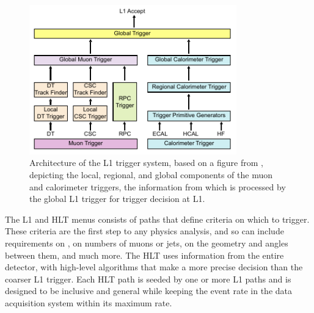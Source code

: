 \begin{figure}[tb]
  \centering
  \includegraphics[width=0.8\textwidth]{figures/cms/L1Architecture.pdf}
  \caption{Architecture of the L1 trigger system, based on a figure from \cite{Chatrchyan:2008zzk}, depicting the local, regional, and global components of the muon and calorimeter triggers, the information from which is processed by the global L1 trigger for trigger decision at L1.}
  \label{cms:L1}
\end{figure}

\pagebreak
The L1 and HLT menus consists of paths that define criteria on which to trigger.
These criteria are the first step to any physics analysis, and so can include requirements on \pT, on numbers of muons or jets, on the geometry and angles between them, and much more.
The HLT uses information from the entire detector, with high-level algorithms that make a more precise decision than the coarser L1 trigger.
Each HLT path is seeded by one or more L1 paths and is designed to be inclusive and general while keeping the event rate in the data acquisition system within its maximum rate.
